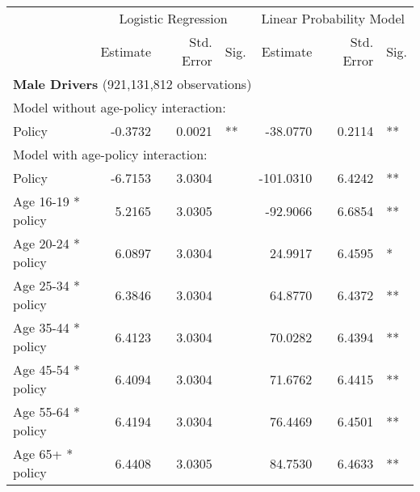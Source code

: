 
\begin{table}%
\centering 
\begin{tabular}{l r r l r r l} 

\hline 
 
 & \multicolumn{3}{c}{Logistic Regression}  & \multicolumn{3}{c}{Linear Probability Model} \\ 

 \cmidrule(lr){2-4}\cmidrule(lr){5-7} 
 & Estimate & Std. Error & Sig. & Estimate & Std. Error & Sig. \\ 

\hline 
 
\multicolumn{7}{l}{\textbf{Male Drivers} (921,131,812 observations)} \\ 

\hline
\multicolumn{7}{l}{Model without age-policy interaction: } \\ 
Policy                   &  -0.3732        &  0.0021       &   **       &  -38.0770        &  0.2114       &   **       \\ 
\hline
\multicolumn{7}{l}{Model with age-policy interaction: } \\ 
Policy                   &  -6.7153        &  3.0304       &            &  -101.0310        &  6.4242       &   **       \\ 
Age 16-19 * policy   &  5.2165        &  3.0305       &            &  -92.9066        &  6.6854       &   **       \\ 
Age 20-24 * policy   &  6.0897        &  3.0304       &            &  24.9917        &  6.4595       &    *       \\ 
Age 25-34 * policy   &  6.3846        &  3.0304       &            &  64.8770        &  6.4372       &   **       \\ 
Age 35-44 * policy   &  6.4123        &  3.0304       &            &  70.0282        &  6.4394       &   **       \\ 
Age 45-54 * policy   &  6.4094        &  3.0304       &            &  71.6762        &  6.4415       &   **       \\ 
Age 55-64 * policy   &  6.4194        &  3.0304       &            &  76.4469        &  6.4501       &   **       \\ 
Age 65+ * policy   &  6.4408        &  3.0305       &            &  84.7530        &  6.4633       &   **       \\ 


\end{tabular}
\end{table}
